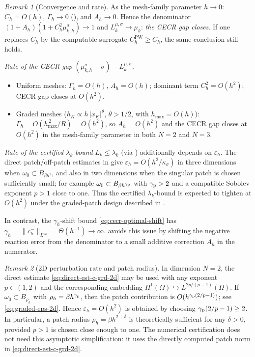 \documentclass[11pt]{article}
\theoremstyle{plain}
\theoremstyle{definition}
\theoremstyle{remark}
\newtheorem{remark}{Remark}
\begin{document}
\begin{remark}[Convergence and rate]
\label{rmk:convergent-rate}
As the mesh-family parameter $h\to 0$: $C_h=O(h)$, $\Gamma_h\to 0$
(), and $A_h\to 0$. Hence the denominator
$(1{+}A_h)(1+C_h^{2}\mu_{k,h}^\sigma)\to 1$ and
$L_k^{\mu,\sigma}\to\mu_k$: \emph{the CECR gap closes}.
If one replaces $C_h$ by the computable surrogate
$C_h^{\mathrm{PW}}\ge C_h$, the same conclusion still holds.

\emph{Rate of the CECR gap} $(\mu_{k,h}^\sigma{-}\sigma)-L_k^{\mu,\sigma}$.
\begin{itemize}
\item Uniform meshes: $\Gamma_h=O(h)$, $A_h=O(h)$; dominant
  term $C_h^2=O(h^2)$; CECR gap closes at $O(h^2)$.
\item Graded meshes ($h_K\propto h\,|x_K|^\theta$, $\theta>1/2$,
  with $h_{\max}=O(h)$):
  $\Gamma_h=O(h_{\max}^{\,2}/R)=O(h^2)$, so $A_h=O(h^2)$
  and the CECR gap closes at $O(h^2)$ in the mesh-family parameter
  in both $N=2$ and $N=3$.
\end{itemize}

\emph{Rate of the certified $\lambda_k$-bound} $L_k\le\lambda_k$
(via ) additionally depends on $\varepsilon_h$.
The direct patch/off-patch estimates in  give
$\varepsilon_h=O(h^2/\kappa_\sigma)$ in three dimensions when
$\omega_0\subset B_{\beta h^2}$, and also in two dimensions when the
singular patch is chosen sufficiently small; for example
$\omega_0\subset B_{\beta h^{\gamma_{\rm p}}}$ with
$\gamma_{\rm p}>2$ and a compatible Sobolev exponent $p>1$ close to
one.  Thus the certified $\lambda_k$-bound is expected to tighten at
$O(h^2)$ under the graded-patch design described in
.

In contrast, the $\gamma_h$-shift bound
\eqref{eq:cecr-optimal-shift} has
$\gamma_h=\|c_h^-\|_{L^\infty}=\Theta(h^{-1})\to\infty$.
 avoids this issue by
shifting the negative reaction error from the denominator
to a small additive correction $A_h$ in the numerator.
\end{remark}

\begin{remark}[2D perturbation rate and patch radius]
\label{rmk:2d-rate}
In dimension $N=2$, the direct estimate
\eqref{eq:direct-est-c-grd-2d} may be used with any exponent
$p\in(1,2)$ and the corresponding embedding
$H^1(\Omega)\hookrightarrow L^{2p/(p-1)}(\Omega)$.
If $\omega_0\subset B_{\rho_h}$ with
$\rho_h=\beta h^{\gamma_{\rm p}}$, then the patch contribution is
$O(h^{\gamma_{\rm p}(2/p-1)})$; see
\eqref{eq:graded-eps-2d}.  Hence $\varepsilon_h=O(h^2)$ is obtained by
choosing $\gamma_{\rm p}(2/p-1)\ge2$.  In particular, a patch radius
$\rho_h=\beta h^{2+\delta}$ is theoretically sufficient for any
$\delta>0$, provided $p>1$ is chosen close enough to one.  The numerical
certification does not need this asymptotic simplification: it uses the
directly computed patch norm in \eqref{eq:direct-est-c-grd-2d}.
\end{remark}
\end{document}

